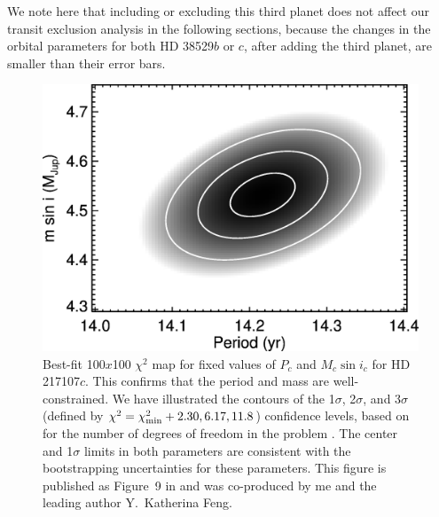 We note here that including or excluding this third planet does not
affect our transit exclusion analysis in the following sections,
because the changes in the orbital parameters for both HD 38529$b$ or
$c$, after adding the third planet, are smaller than their error bars.



\newpage

\begin{figure}
\includegraphics[scale=0.6]{boottran/feng2015-f9-217107.eps} 
\caption{Best-fit 100$x$100 $\chi^2$ map for fixed values of $P_c$ and
  $M_c\sin{i_c}$ for HD 217107$c$. This confirms that the period and
  mass are well-constrained.  We have illustrated the contours of the
  1$\sigma$, 2$\sigma$, and 3$\sigma$ (defined by $\chi^2 =
  \chi^2_{\rm min} + {2.30, 6.17, 11.8}$) confidence levels, based on
  for the number of degrees of freedom in the problem
  \citep{2002nrca.book.....P}. The center and 1$\sigma$ limits in both
  parameters are consistent with the bootstrapping uncertainties for
  these parameters. This figure is published as Figure~9 in
  \cite{2015ApJ...800...22F} and was co-produced by me and the
  leading author Y.\ Katherina Feng.
\label{boottran:mmperplot}}
\end{figure}


